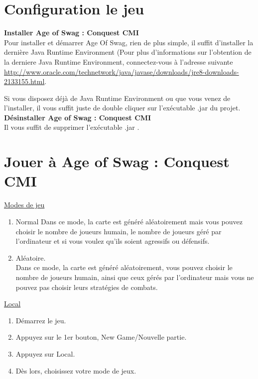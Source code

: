   \section{Configuration le jeu}
  \textbf{Installer Age of Swag : Conquest CMI}\\
  
  Pour installer et démarrer Age Of Swag, rien de plus simple, il suffit d'installer la dernière Java Runtime Environment (Pour plus d'informations sur l'obtention de la derniere Java Runtime Environment, connectez-vous à l'adresse suivante \url{http://www.oracle.com/technetwork/java/javase/downloads/jre8-downloads-2133155.html}.

  Si vous disposez déjà de Java Runtime Environment ou que vous venez de l'installer, il vous suffit juste de double cliquer sur l'exécutable .jar du projet.\\
  
    \textbf{Désinstaller Age of Swag : Conquest CMI}\\
    
    Il vous suffit de supprimer l'exécutable .jar .\\
    
    \section{Jouer à Age of Swag : Conquest CMI}
	     
    \underline{Modes de jeu}\\ 
     
 \begin{enumerate}
\item Normal
 Dans ce mode, la carte est généré aléatoirement mais vous pouvez choisir le nombre de joueurs humain, le nombre de joueurs géré par l'ordinateur et si vous voulez qu'ils soient agressifs ou défensifs.\\
\item Aléatoire.\\
 Dans ce mode, la carte est généré aléatoirement, vous pouvez choisir le nombre de joueurs humain, ainsi que ceux gérés par l'ordinateur mais vous ne pouvez pas choisir leurs stratégies de combats.\\
\end{enumerate}     
     
     \underline{Local}\\
     
     \begin{enumerate}
\item Démarrez le jeu.
\item Appuyez sur le 1er bouton, New Game/Nouvelle partie.
\item Appuyez sur Local.
\item Dès lors, choisissez votre mode de jeux.\\
\end{enumerate}
     
